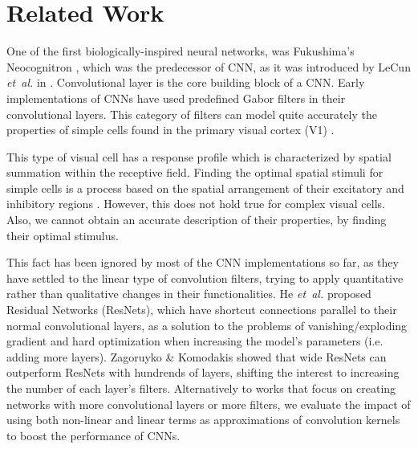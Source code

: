 \documentclass[10pt,twocolumn,letterpaper]{article}
\begin{document}

\section{Related Work}
\label{RelWork}

     One of the first biologically-inspired neural networks, was Fukushima's Neocognitron \cite{Fukushima80}, which was the predecessor of CNN, as it was introduced by LeCun \textit{et~al.} in \cite{LeCun90}. Convolutional layer is the core building block of a CNN. Early implementations of CNNs have used predefined Gabor filters in their convolutional layers. This category of filters can model quite accurately the properties of simple cells found in the primary visual cortex (V1) \cite{Marcelja80}.
     
     This type of visual cell has a response profile which is characterized by spatial summation within the receptive field. Finding the optimal spatial stimuli \cite{Foldiak01} for simple cells is a process based on the spatial arrangement of their excitatory and inhibitory regions \cite{Movshon78}. However, this does not hold true for complex visual cells. Also, we cannot obtain an accurate description of their properties, by finding their optimal stimulus.
     
     This fact has been ignored by most of the CNN implementations so far, as they have settled to the linear type of convolution filters, trying to apply quantitative rather than qualitative changes in their functionalities.  He \textit{et~al.} \cite{He15} proposed Residual Networks (ResNets), which have shortcut connections parallel to their normal convolutional layers, as a solution to the problems of vanishing/exploding gradient and hard optimization when increasing the model's parameters (i.e. adding more layers).
     Zagoruyko \& Komodakis \cite{WRN16} showed that wide ResNets can outperform ResNets with hundrends of layers, shifting the interest to increasing the number of each layer's filters. Alternatively to works that focus on creating networks with more convolutional layers or more filters, we evaluate the impact of using both non-linear and linear terms as approximations of convolution kernels to boost the performance of CNNs.
     
\end{document}
